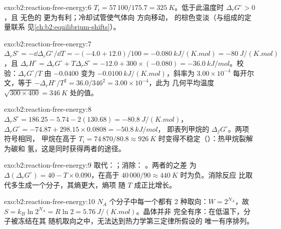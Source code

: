 \begin{solution}{exo:b2:reaction-free-energy:6}
$T_i = 57\,100/175.7 = \qty{325}{K}$。低于此温度时 $\Delta_r G^\circ > 0$，且
无色的  更为有利；冷却试管使气体向
 方向移动， 的棕色变淡（与组成的定量联系
见\cref{ch:b2:equilibrium-shifts}）。
\end{solution}

\begin{solution}{exo:b2:reaction-free-energy:7}
$\Delta_r S^\circ = -\dd\Delta_r G^\circ/\dd T = -(-4.0 + 12.0)/100 =
\qty{-0.080}{kJ/(K.mol)} = \qty{-80}{J/(K.mol)}$，且 $\Delta_r H^\circ =
\Delta_r G^\circ + T\Delta_r S^\circ = -12.0 + 300 \times (-0.080) =
\qty{-36.0}{kJ/mol}$。校验：$\Delta_r G^\circ/T$ 由 $-0.0400$ 变为
$\qty{-0.0100}{kJ/(K.mol)}$，斜率为 $3.00 \times 10^{-4}$ 每开尔文，等于
$-\Delta_r H^\circ/T^2 = 36.0/346^2 = 3.00 \times 10^{-4}$，此为
几何平均温度 $\sqrt{300 \times 400} = \qty{346}{K}$ 处的值。
\end{solution}

\begin{solution}{exo:b2:reaction-free-energy:8}
$\Delta_r S^\circ = 186.25 - 5.74 - 2(130.68) = \qty{-80.8}{J/(K.mol)}$，
$\Delta_r G^\circ = -74.87 + 298.15 \times 0.0808 = \qty{-50.8}{kJ/mol}$，
即表列甲烷的 $\Delta_f G^\circ$。两项符号相同，
甲烷在高于 $T_i = 74\,870/80.8 \approx
\qty{926}{K}$ 时变得不稳定（）：热甲烷裂解为碳和
氢，这是同时获得两者的途径。
\end{solution}

\begin{solution}{exo:b2:reaction-free-energy:9}
取代：；消除：
。两者的之差
为 $\Delta(\Delta_r G^\circ) = 40 - T \times
0.090$，在高于 $40\,000/90 \approx \qty{440}{K}$ 时为负。消除反应
比取代多生成一个分子，其熵更大，熵项
随 $T$ 成正比增长。
\end{solution}

\begin{solution}{exo:b2:reaction-free-energy:10}
$N_A$ 个分子中每一个都有 2 种取向：$W = 2^{N_A}$，故 $S =
k_B\ln 2^{N_A} = R\ln 2 = \qty{5.76}{J/(K.mol)}$。晶体并非
完全有序：在低温下，分子被冻结在其
随机取向之中，无法达到热力学第三定律所假设的
唯一有序排列。
\end{solution}

